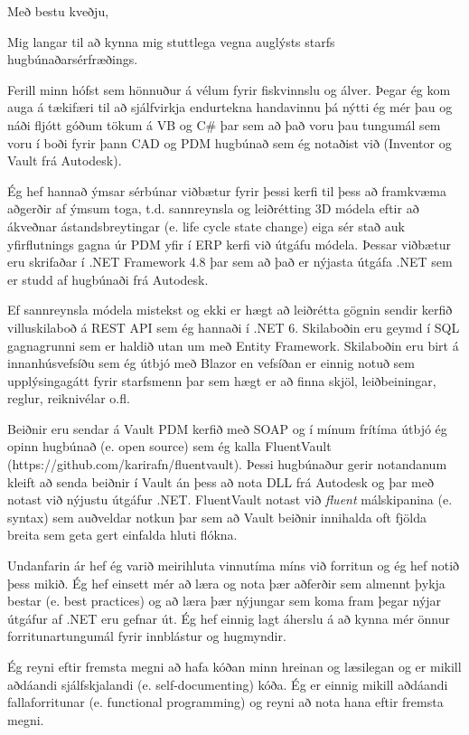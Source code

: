 \documentclass[11pt,a4paper,sans]{moderncv}
\begin{document}
{
    \fancyfoot[r]{}
    \setcounter{page}{0}
    \date{\today}
    \closing{Með bestu kveðju,}
    
    \makelettertitle

    Mig langar til að kynna mig stuttlega vegna auglýsts starfs hugbúnaðarsérfræðings.

    Ferill minn hófst sem hönnuður á vélum fyrir fiskvinnslu og álver. Þegar ég kom auga á tækifæri til að sjálfvirkja endurtekna handavinnu þá nýtti ég mér þau og náði fljótt góðum tökum á VB og C\# þar sem að það voru þau tungumál sem voru í boði fyrir þann CAD og PDM hugbúnað sem ég notaðist við (Inventor og Vault frá Autodesk).

    Ég hef hannað ýmsar sérbúnar viðbætur fyrir þessi kerfi til þess að framkvæma aðgerðir af ýmsum toga, t.d. sannreynsla og leiðrétting 3D módela eftir að ákveðnar ástandsbreytingar (e. life cycle state change) eiga sér stað auk yfirflutnings gagna úr PDM yfir í ERP kerfi við útgáfu módela. Þessar viðbætur eru skrifaðar í .NET Framework 4.8 þar sem að það er nýjasta útgáfa .NET sem er studd af hugbúnaði frá Autodesk.
    
    Ef sannreynsla módela mistekst og ekki er hægt að leiðrétta gögnin sendir kerfið villuskilaboð á REST API sem ég hannaði í .NET 6. Skilaboðin eru geymd í SQL gagnagrunni sem er haldið utan um með Entity Framework. Skilaboðin eru birt á innanhúsvefsíðu sem ég útbjó með Blazor en vefsíðan er einnig notuð sem upplýsingagátt fyrir starfsmenn þar sem hægt er að finna skjöl, leiðbeiningar, reglur, reiknivélar o.fl.

    Beiðnir eru sendar á Vault PDM kerfið með SOAP og í mínum frítíma útbjó ég opinn hugbúnað (e. open source) sem ég kalla FluentVault (https://github.com/karirafn/fluentvault). Þessi hugbúnaður gerir notandanum kleift að senda beiðnir í Vault án þess að nota DLL frá Autodesk og þar með notast við nýjustu útgáfur .NET. FluentVault notast við \emph{fluent} málskipanina (e. syntax) sem auðveldar notkun þar sem að Vault beiðnir innihalda oft fjölda breita sem geta gert einfalda hluti flókna.

    Undanfarin ár hef ég varið meirihluta vinnutíma míns við forritun og ég hef notið þess mikið. Ég hef einsett mér að læra og nota þær aðferðir sem almennt þykja bestar (e. best practices) og að læra þær nýjungar sem koma fram þegar nýjar útgáfur af .NET eru gefnar út. Ég hef einnig lagt áherslu á að kynna mér önnur forritunartungumál fyrir innblástur og hugmyndir.

    Ég reyni eftir fremsta megni að hafa kóðan minn hreinan og læsilegan og er mikill aðdáandi sjálfskjalandi (e. self-documenting) kóða. Ég er einnig mikill aðdáandi fallaforritunar (e. functional programming) og reyni að nota hana eftir fremsta megni.

}
\end{document}
